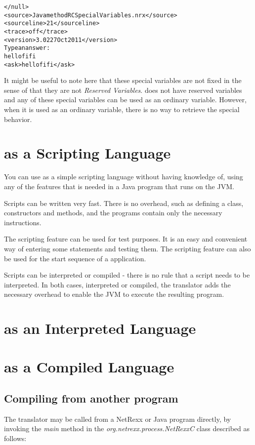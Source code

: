 {\begin{alltt}
</null>
<source>Java method RCSpecialVariables.nrx</source>
<sourceline>21</sourceline>
<trace>off</trace>
<version>\nr{} 3.02 27 Oct 2011</version>
Type an answer:
hello fifi
<ask>hello fifi</ask>
\end{alltt}
It might be useful to note here that these special variables are not
fixed in the sense of that they are not \emph{Reserved Variables}. \nr{}
does not have reserved variables and any of these special variables
can be used as an ordinary variable. However, when it is used as an
ordinary variable, there is no way to retrieve the special behavior.
\chapter{\nr{} as a Scripting Language}
You can use \nr{} as a simple scripting language without having
knowledge of, using any of the features that is needed in a Java
program that runs on the JVM. 

Scripts can be written very fast. There is
no overhead, such as defining a class, constructors and methods, and the programs contain only
the necessary instructions.

The scripting feature can be used for test purposes. It is an easy and convenient way of entering some statements and testing them.
The scripting feature can also be used for the start sequence of a
\nr{} application.

Scripts can be interpreted or compiled - there is no rule that a
script needs to be interpreted. In both cases, interpreted or
compiled, the \nr{} translator adds the necessary overhead to enable
the JVM to execute the resulting program.

\chapter{\nr{} as an Interpreted Language}\label{interpreted}

\chapter{\nr{} as a Compiled Language}
\section{Compiling from another program}

The translator may be called from a NetRexx or Java program directly, by
invoking the \emph{main} method in the \emph{org.netrexx.process.NetRexxC}
class described as follows:

}
